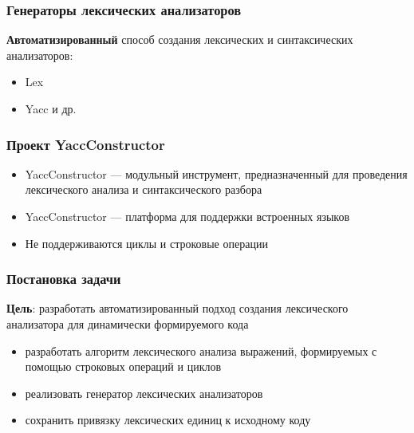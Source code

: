 \documentclass{beamer}
\begin{document}
\begin{frame}
\transwipe[direction=90]
\frametitle{Генераторы лексических анализаторов}

\textbf{Автоматизированный} способ создания лексических и синтаксических анализаторов:
\begin{itemize}
\item Lex
\item Yacc и др.
\end{itemize}
\end{frame}

\begin{frame}
\transwipe[direction=90]
\frametitle{Проект YaccConstructor}
\begin{itemize}
\item YaccConstructor --- модульный инструмент, предназначенный для проведения лексического анализа и синтаксического разбора
\item YaccConstructor --- платформа для поддержки встроенных языков
\newline
\item Не поддерживаются циклы и строковые операции
\end{itemize}
\end{frame}


\begin{frame}
\transwipe[direction=90]
\frametitle{Постановка задачи}
\textbf{Цель}: разработать автоматизированный подход создания лексического анализатора для динамически формируемого кода

\begin{itemize}
\item разработать алгоритм лексического анализа выражений, формируемых с помощью строковых операций и циклов
\item реализовать генератор лексических анализаторов
\item сохранить привязку лексических единиц к исходному коду
\end{itemize}
\end{frame}
\end{document}

